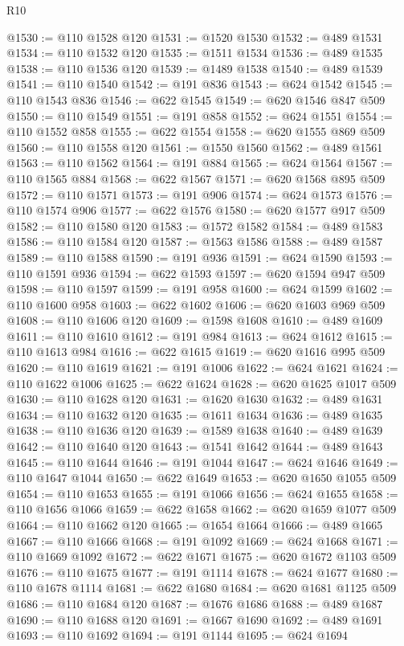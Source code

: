 \begin{lexlean}{R10}
\begin{coremodule}
{{{{{{{{{{{{{{{{{{{{{{{{{{{{{{{{{{{{{{{{{{{{{{{{{{{{{{{{{{{{{{{{{{{{{{{{{{{{{{{{{{{{@1530 := @110 @1528 @120
@1531 := @1520 @1530
@1532 := @489 @1531
@1534 := @110 @1532 @120
@1535 := @1511 @1534
@1536 := @489 @1535
@1538 := @110 @1536 @120
@1539 := @1489 @1538
@1540 := @489 @1539
@1541 := @110 @1540
@1542 := @191 @836
@1543 := @624 @1542
@1545 := @110 @1543 @836
@1546 := @622 @1545
@1549 := @620 @1546 @847 @509
@1550 := @110 @1549
@1551 := @191 @858
@1552 := @624 @1551
@1554 := @110 @1552 @858
@1555 := @622 @1554
@1558 := @620 @1555 @869 @509
@1560 := @110 @1558 @120
@1561 := @1550 @1560
@1562 := @489 @1561
@1563 := @110 @1562
@1564 := @191 @884
@1565 := @624 @1564
@1567 := @110 @1565 @884
@1568 := @622 @1567
@1571 := @620 @1568 @895 @509
@1572 := @110 @1571
@1573 := @191 @906
@1574 := @624 @1573
@1576 := @110 @1574 @906
@1577 := @622 @1576
@1580 := @620 @1577 @917 @509
@1582 := @110 @1580 @120
@1583 := @1572 @1582
@1584 := @489 @1583
@1586 := @110 @1584 @120
@1587 := @1563 @1586
@1588 := @489 @1587
@1589 := @110 @1588
@1590 := @191 @936
@1591 := @624 @1590
@1593 := @110 @1591 @936
@1594 := @622 @1593
@1597 := @620 @1594 @947 @509
@1598 := @110 @1597
@1599 := @191 @958
@1600 := @624 @1599
@1602 := @110 @1600 @958
@1603 := @622 @1602
@1606 := @620 @1603 @969 @509
@1608 := @110 @1606 @120
@1609 := @1598 @1608
@1610 := @489 @1609
@1611 := @110 @1610
@1612 := @191 @984
@1613 := @624 @1612
@1615 := @110 @1613 @984
@1616 := @622 @1615
@1619 := @620 @1616 @995 @509
@1620 := @110 @1619
@1621 := @191 @1006
@1622 := @624 @1621
@1624 := @110 @1622 @1006
@1625 := @622 @1624
@1628 := @620 @1625 @1017 @509
@1630 := @110 @1628 @120
@1631 := @1620 @1630
@1632 := @489 @1631
@1634 := @110 @1632 @120
@1635 := @1611 @1634
@1636 := @489 @1635
@1638 := @110 @1636 @120
@1639 := @1589 @1638
@1640 := @489 @1639
@1642 := @110 @1640 @120
@1643 := @1541 @1642
@1644 := @489 @1643
@1645 := @110 @1644
@1646 := @191 @1044
@1647 := @624 @1646
@1649 := @110 @1647 @1044
@1650 := @622 @1649
@1653 := @620 @1650 @1055 @509
@1654 := @110 @1653
@1655 := @191 @1066
@1656 := @624 @1655
@1658 := @110 @1656 @1066
@1659 := @622 @1658
@1662 := @620 @1659 @1077 @509
@1664 := @110 @1662 @120
@1665 := @1654 @1664
@1666 := @489 @1665
@1667 := @110 @1666
@1668 := @191 @1092
@1669 := @624 @1668
@1671 := @110 @1669 @1092
@1672 := @622 @1671
@1675 := @620 @1672 @1103 @509
@1676 := @110 @1675
@1677 := @191 @1114
@1678 := @624 @1677
@1680 := @110 @1678 @1114
@1681 := @622 @1680
@1684 := @620 @1681 @1125 @509
@1686 := @110 @1684 @120
@1687 := @1676 @1686
@1688 := @489 @1687
@1690 := @110 @1688 @120
@1691 := @1667 @1690
@1692 := @489 @1691
@1693 := @110 @1692
@1694 := @191 @1144
@1695 := @624 @1694
}}}}}}}}}}}}}}}}}}}}}}}}}}}}}}}}}}}}}}}}}}}}}}}}}}}}}}}}}}}}}}}}}}}}}}}}}}}}}}}}}}}}
\end{coremodule}
\end{lexlean}
